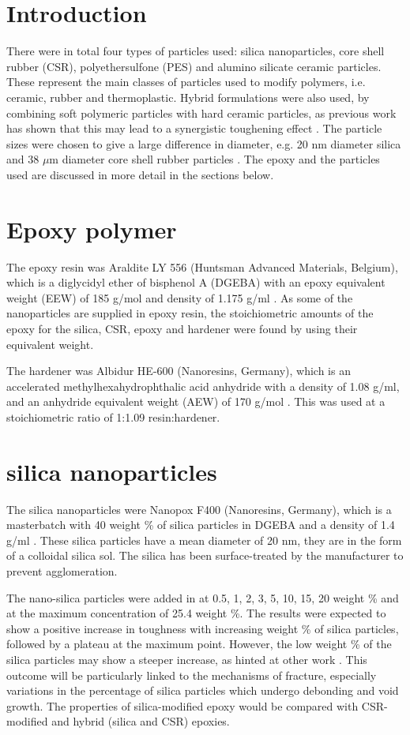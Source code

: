 \documentclass[numbers=noendperiod,chapterprefix=on]{icldt} %
\begin{document}
\section{Introduction}
There were in total four types of particles used: silica nanoparticles, core shell rubber (CSR), polyethersulfone (PES) and alumino silicate ceramic particles. These represent the main classes of particles used to modify polymers, i.e. ceramic, rubber and thermoplastic. Hybrid formulations were also used, by combining soft polymeric particles with hard ceramic particles, as previous work has shown that this may lead to a synergistic toughening effect \cite{Mohammed2008}. The particle sizes were chosen to give a large difference in diameter, e.g. 20 nm diameter silica and 38 $ \mu $m diameter core shell rubber particles . 
The epoxy and the particles used are discussed in more detail in the sections below.

\section{Epoxy polymer}
The epoxy resin was Araldite LY 556 (Huntsman Advanced Materials, Belgium), which is a diglycidyl ether of bisphenol A (DGEBA) with an epoxy equivalent weight (EEW) of 185 g/mol and density of 1.175 g/ml \cite{Huntsman2004}. 
As some of the nanoparticles are supplied in epoxy resin, the stoichiometric amounts of the epoxy for the silica, CSR, epoxy and hardener were found by using their equivalent weight.  

The hardener was Albidur HE-600 (Nanoresins, Germany), which is an accelerated methylhexahydrophthalic acid anhydride with a density of 1.08 g/ml, and an anhydride equivalent weight (AEW) of 170 g/mol \cite{Resins2006}. This was used at a stoichiometric ratio of 1:1.09 resin:hardener.

\section{silica nanoparticles}

The silica nanoparticles were Nanopox F400 (Nanoresins, Germany), which is a masterbatch with 40 weight \% of silica particles in DGEBA and a density of 1.4 g/ml \cite{Industries2008}.
These silica particles have a mean diameter of 20 nm, they are in the form of a colloidal silica sol. The silica has been surface-treated by the manufacturer to prevent agglomeration.

The nano-silica particles were added in at 0.5, 1, 2, 3, 5, 10, 15, 20 weight \% and at the maximum concentration of 25.4 weight \%. The results were expected to show a positive increase in toughness with increasing weight \% of silica particles, followed by a plateau at the maximum point. However, the low weight \% of the silica particles may show a steeper increase, as hinted at other work \cite{Garg}. This outcome will be particularly linked to the mechanisms of fracture, especially variations in the percentage of silica particles which undergo debonding and void growth. The properties of silica-modified epoxy would be compared with CSR-modified and hybrid (silica and CSR) epoxies.
\end{document}
